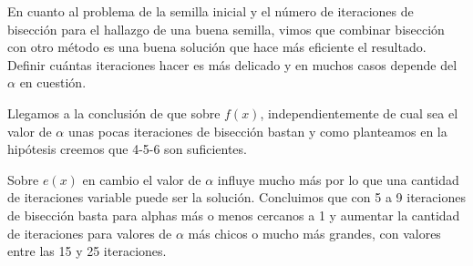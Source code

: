 

En cuanto al problema de la semilla inicial y el número de iteraciones de bisección para el hallazgo de una buena semilla, vimos que combinar bisección con otro método es una buena solución que hace más eficiente el resultado. Definir cuántas iteraciones hacer es más delicado y en muchos casos depende del $\alpha$ en cuestión. 

Llegamos a la conclusión de que sobre $f(x)$, independientemente de cual sea el valor de $\alpha$ unas pocas iteraciones de bisección bastan y como planteamos en la hipótesis creemos que 4-5-6 son suficientes.

Sobre $e(x)$ en cambio el valor de $\alpha$ influye mucho más por lo que una cantidad de iteraciones variable puede ser la solución. Concluimos que con 5 a 9 iteraciones de bisección basta para alphas más o menos cercanos a 1 y aumentar la cantidad de iteraciones para valores de $\alpha$ más chicos o mucho más grandes, con valores entre las 15 y 25 iteraciones.
